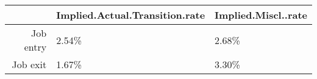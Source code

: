 \begin{table}[ht]
\centering
\begin{tabular}{rll}
  \hline
 & Implied.Actual.Transition.rate & Implied.Miscl..rate \\ 
  \hline
Job entry & 2.54\% & 2.68\% \\ 
  Job exit & 1.67\% & 3.30\% \\ 
   \hline
\end{tabular}
\end{table}
